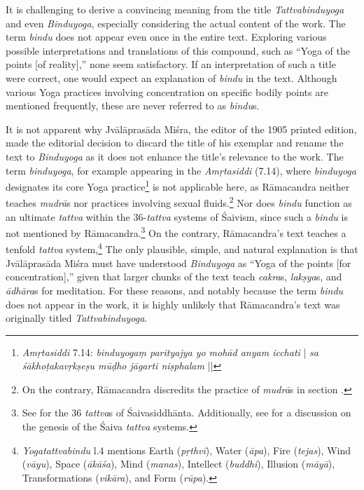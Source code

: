 It is challenging to derive a convincing meaning from the title \emph{Tattvabinduyoga} and even \emph{Binduyoga}, especially considering the actual content of the work. The term \textit{bindu} does not appear even once in the entire text. Exploring various possible interpretations and translations of this compound, such as ``Yoga of the points [of reality],'' none seem satisfactory. If an interpretation of such a title were correct, one would expect an explanation of \textit{bindu} in the text. Although various Yoga practices involving concentration on specific bodily points are mentioned frequently, these are never referred to as \textit{bindu}s.

It is not apparent why Jvālāprasāda Miśra, the editor of the 1905 printed edition, made the editorial decision to discard the title of his exemplar and rename the text to \emph{Binduyoga} as it does not enhance the title's relevance to the work. The term \textit{binduyoga}, for example appearing in the \emph{Amṛtasiddi} (7.14), where \textit{binduyoga} designates its core Yoga practice\footnote{\emph{Amṛtasiddi} 7.14: \textit{binduyogaṃ parityajya yo mohād anyam icchati} | \textit{sa śākhoṭakavṛkṣeṣu mūḍho jāgarti niṣphalam} ||} is not applicable here, as Rāmacandra neither teaches \textit{mudrā}s nor practices involving sexual fluids.\footnote{On the contrary, Rāmacandra discredits the practice of \textit{mudrā}s in section .} Nor does \textit{bindu} function as an ultimate \textit{tattva} within the 36-\textit{tattva} systems of Śaivism, since such a \textit{bindu} is not mentioned by Rāmacandra.\footnote{See \citeauthor[1996: 177]{gengnagel1996} for the 36 \textit{tattva}s of Śaivasiddhānta. Additionally, see \citeauthor[2016: 77 et seqq.]{goodall2016tattvas} for a discussion on the genesis of the Śaiva \textit{tattva} systems.} On the contrary, Rāmacandra's text teaches a tenfold \textit{tattva} system,\footnote{\emph{Yogatattvabindu}  l.4 mentions Earth (\textit{pṛthvī}), Water (\textit{āpa}), Fire (\textit{tejas}), Wind (\textit{vāyu}), Space (\textit{ākāśa}), Mind (\textit{manas}), Intellect (\textit{buddhi}), Illusion (\textit{māyā}), Transformations (\textit{vikāra}), and Form (\textit{rūpa}).} The only plausible, simple, and natural explanation is that Jvālāprasāda Miśra must have understood \emph{Binduyoga} as ``Yoga of the points [for concentration],'' given that larger chunks of the text teach \textit{cakra}s, \textit{lakṣya}s, and \textit{ādhāra}s for meditation. For these reasons, and notably because the term \textit{bindu} does not appear in the work, it is highly unlikely that Rāmacandra's text was originally titled \emph{Tattvabinduyoga}.

